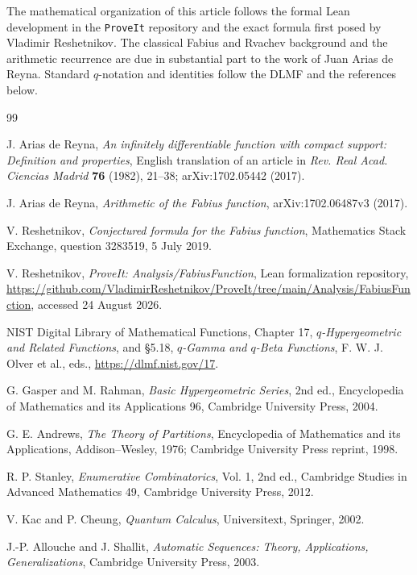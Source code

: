 \documentclass[11pt,oneside]{article}
\theoremstyle{definition}
\theoremstyle{remark}
\begin{document}
The mathematical organization of this article follows the formal Lean
development in the \texttt{ProveIt} repository and the exact formula first
posed by Vladimir Reshetnikov.  The classical Fabius and Rvachev background
and the arithmetic recurrence are due in substantial part to the work of
Juan Arias de Reyna.  Standard $q$-notation and identities follow the DLMF
and the references below.

\begin{thebibliography}{99}

J. Arias de Reyna,
\emph{An infinitely differentiable function with compact support: Definition
and properties},
English translation of an article in \emph{Rev. Real Acad. Ciencias Madrid}
\textbf{76} (1982), 21--38; arXiv:1702.05442 (2017).

J. Arias de Reyna,
\emph{Arithmetic of the Fabius function},
arXiv:1702.06487v3 (2017).

V. Reshetnikov,
\emph{Conjectured formula for the Fabius function},
Mathematics Stack Exchange, question 3283519, 5 July 2019.

V. Reshetnikov,
\emph{ProveIt: Analysis/FabiusFunction},
Lean formalization repository,
\url{https://github.com/VladimirReshetnikov/ProveIt/tree/main/Analysis/FabiusFunction},
accessed 24 August 2026.

NIST Digital Library of Mathematical Functions,
Chapter 17, \emph{$q$-Hypergeometric and Related Functions},
and \S5.18, \emph{$q$-Gamma and $q$-Beta Functions},
F. W. J. Olver et al., eds.,
\url{https://dlmf.nist.gov/17}.

G. Gasper and M. Rahman,
\emph{Basic Hypergeometric Series},
2nd ed., Encyclopedia of Mathematics and its Applications 96,
Cambridge University Press, 2004.

G. E. Andrews,
\emph{The Theory of Partitions},
Encyclopedia of Mathematics and its Applications,
Addison--Wesley, 1976; Cambridge University Press reprint, 1998.

R. P. Stanley,
\emph{Enumerative Combinatorics}, Vol. 1,
2nd ed., Cambridge Studies in Advanced Mathematics 49,
Cambridge University Press, 2012.

V. Kac and P. Cheung,
\emph{Quantum Calculus},
Universitext, Springer, 2002.

J.-P. Allouche and J. Shallit,
\emph{Automatic Sequences: Theory, Applications, Generalizations},
Cambridge University Press, 2003.

\end{thebibliography}
\end{document}
